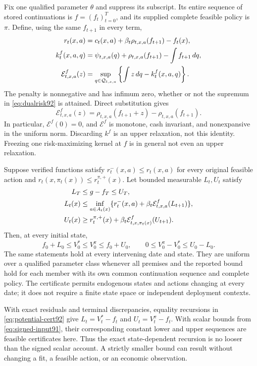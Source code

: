 Fix one qualified parameter $\theta$ and suppress its subscript. Its entire sequence of stored continuations is $f=(f_t)_{t=0}^T$, and its supplied complete feasible policy is $\pi$. Define, using the same $f_{t+1}$ in every term,
\begin{align}\label{eq:centered-def92}
 r_t(x,a)&=c_t(x,a)+\beta_t\rho_{t,x,a}(f_{t+1})-f_t(x),\notag\\
 k_t^f(x,a,q)&=\psi_{t,x,a}(q)+\rho_{t,x,a}(f_{t+1})
                         -\int f_{t+1}\,dq,\notag\\
 \mathcal E_{t,x,a}^f(z)&=\sup_{q\in\mathcal Q_{t,x,a}}
                   \left\{\int z\,dq-k_t^f(x,a,q)\right\}.
\end{align}
The penalty is nonnegative and has infimum zero, whether or not the supremum in \eqref{eq:dualrisk92} is attained. Direct substitution gives
\begin{equation}\label{eq:exact-center92}
 \mathcal E_{t,x,a}^f(z)
 =\rho_{t,x,a}(f_{t+1}+z)-\rho_{t,x,a}(f_{t+1}).
\end{equation}
In particular, $\mathcal E^f(0)=0$, and $\mathcal E^f$ is monotone, cash invariant, and nonexpansive in the uniform norm. Discarding $k^f$ is an upper relaxation, not this identity. Freezing one risk-maximizing kernel at $f$ is in general not even an upper relaxation.

\begin{theorem}\label{thm:centeredrisk92}
Suppose verified functions satisfy $r_t^-(x,a)\le r_t(x,a)$ for every original feasible action and $r_t(x,\pi_t(x))\le r_t^{\pi,+}(x)$. Let bounded measurable $L_t,U_t$ satisfy
\begin{align}\label{eq:potential-cert92}
 L_T&\le g-f_T\le U_T,\notag\\
 L_t(x)&\le\inf_{a\in A_t(x)}
       \{r_t^-(x,a)+\beta_t\mathcal E_{t,x,a}^f(L_{t+1})\},\notag\\
 U_t(x)&\ge r_t^{\pi,+}(x)
                +\beta_t\mathcal E_{t,x,\pi_t(x)}^f(U_{t+1}).
\end{align}
Then, at every initial state,
\begin{equation}\label{eq:potential-loss92}
 f_0+L_0\le V_0^*\le V_0^\pi\le f_0+U_0,
 \qquad 0\le V_0^\pi-V_0^*\le U_0-L_0.
\end{equation}
The same statements hold at every intervening date and state. They are uniform over a qualified parameter class whenever all premises and the reported bound hold for each member with its own common continuation sequence and complete policy. The certificate permits endogenous states and actions changing at every date; it does not require a finite state space or independent deployment contexts.

With exact residuals and terminal discrepancies, equality recursions in \eqref{eq:potential-cert92} give $L_t=V_t^*-f_t$ and $U_t=V_t^\pi-f_t$. With scalar bounds from \eqref{eq:signed-input91}, their corresponding constant lower and upper sequences are feasible certificates here. Thus the exact state-dependent recursion is no looser than the signed scalar account. A strictly smaller bound can result without changing a fit, a feasible action, or an economic observation.
\end{theorem}

